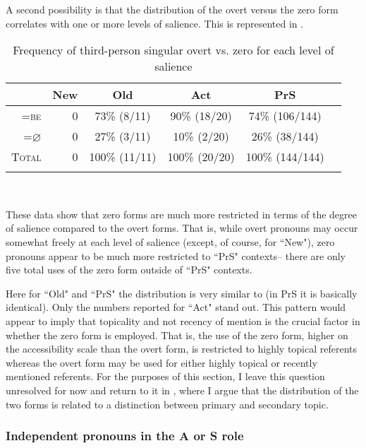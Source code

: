 A second possibility is that the distribution of the overt versus the zero form correlates with one or more levels of salience. This is represented in .
\begin{table}

\caption{{Frequency of third-person singular overt vs. zero for each level of salience}}
\begin{tabular}{| r | r  c  c  c  c }
\lsptoprule
 & New & Old & Act & PrS \\

\midrule
\textsc{=be} & 0 & 73{\%} (8/11) & 90{\%} (18/20) & 74{\%} (106/144) \\

\midrule
\textsc{=$\varnothing$} & 0 & 27{\%} (3/11) & 10{\%} (2/20) & 26{\%} (38/144) \\

\midrule
\textsc{Total} & 0 & 100{\%} (11/11) & 100{\%} (20/20) & 100{\%} (144/144)  \\

\lspbottomrule
\end{tabular}\\
\label{overtvszerovsgiven}

\end{table}
These data show that zero forms are much more restricted in terms of the degree of salience compared to the overt forms. That is, while overt pronouns may occur somewhat freely at each level of salience (except, of course, for ``New"), zero pronouns appear to be much more restricted to ``PrS" contexts-- there are only five total uses of the zero form outside of ``PrS" contexts.

Here for ``Old" and ``PrS" the distribution is very similar to  (in PrS it is basically identical). Only the numbers reported for ``Act" stand out. This pattern would appear to imply that topicality and not recency of mention is the crucial factor in whether the zero form is employed. That is, the use of the zero form, higher on the accessibility scale than the overt form, is restricted to highly topical referents whereas the overt form may be used for either highly topical or recently mentioned referents. For the purposes of this section, I leave this question unresolved for now and return to it in , where I argue that the distribution of the two forms is related to a distinction between primary and secondary topic. 
 

\subsubsection{Independent pronouns in the A or S role}\label{markedtopics}

